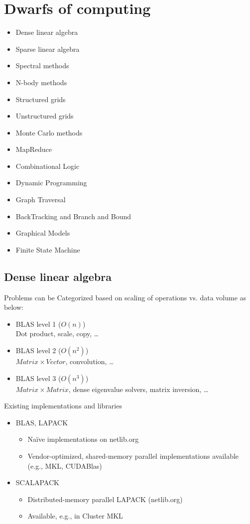 \section{Dwarfs of computing}
\begin{itemize}
    \item Dense linear algebra
    \item Sparse linear algebra
    \item Spectral methods
    \item N-body methods
    \item Structured grids
    \item Unstructured grids
    \item Monte Carlo methods
    \item MapReduce
    \item Combinational Logic
    \item Dynamic Programming
    \item Graph Traversal
    \item BackTracking and Branch and Bound
    \item Graphical Models
    \item Finite State Machine
\end{itemize}

\subsection{Dense linear algebra}
Problems can be Categorized based on scaling of operations vs. data volume as below:
\begin{itemize}
    \item BLAS level 1 ($ O(n) $)
        \\ Dot product, scale, copy, \dots
    \item BLAS level 2 ($ O(n^2) $)
        \\ $ Matrix \times Vector $, convolution, \dots
    \item BLAS level 3 ($ O(n^3) $)
        \\ $ Matrix \times Matrix $, dense eigenvalue solvers, matrix inversion, \dots
\end{itemize}

Existing implementations and libraries
\begin{itemize}
    \item BLAS, LAPACK
        \begin{itemize}
            \item Naïve implementations on netlib.org
            \item Vendor-optimized, shared-memory parallel implementations available (e.g., MKL, CUDABlas)
        \end{itemize}
    \item SCALAPACK
        \begin{itemize}
            \item Distributed-memory parallel LAPACK (netlib.org)
            \item Available, e.g., in Cluster MKL
        \end{itemize}
\end{itemize}

